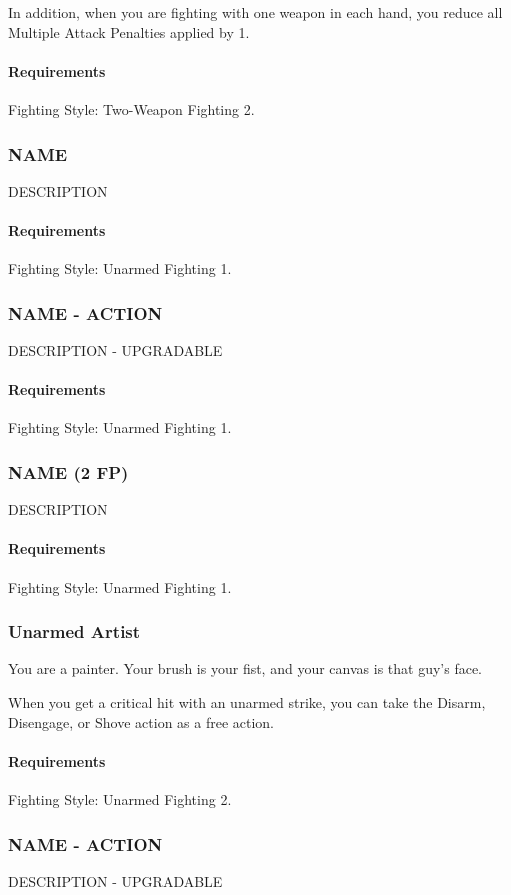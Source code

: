     In addition, when you are fighting with one weapon in each hand, you reduce all Multiple Attack Penalties applied by 1.
    \paragraph{Requirements} Fighting Style: Two-Weapon Fighting 2.
\subsubsection{NAME} \label{feat::name}
    DESCRIPTION
    \paragraph{Requirements} Fighting Style: Unarmed Fighting 1.
\subsubsection{NAME - ACTION} \label{feat::name}
    DESCRIPTION - UPGRADABLE
    \paragraph{Requirements} Fighting Style: Unarmed Fighting 1.
\subsubsection{NAME (2 FP)} \label{feat::name}
    DESCRIPTION
    \paragraph{Requirements} Fighting Style: Unarmed Fighting 1.
\subsubsection{Unarmed Artist} \label{feat::unarmedartist}
    You are a painter.
    Your brush is your fist, and your canvas is that guy's face.

    When you get a critical hit with an unarmed strike, you can take the Disarm, Disengage, or Shove action as a free action.
    \paragraph{Requirements} Fighting Style: Unarmed Fighting 2.
\subsubsection{NAME - ACTION} \label{feat::name}
    DESCRIPTION - UPGRADABLE
